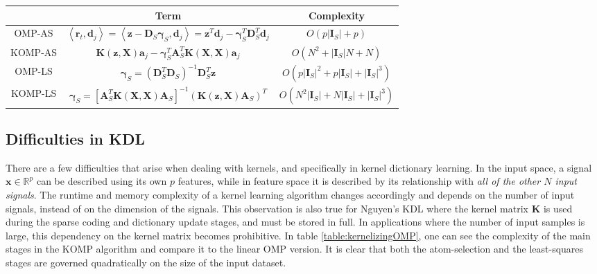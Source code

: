 \documentclass[journal]{IEEEtran}
\newcommand{\bD}{\mathbf{D}}
\newcommand{\bd}{\mathbf{d}}
\newcommand{\br}{\mathbf{r}}
\newcommand{\bx}{\mathbf{x}}
\newcommand{\bz}{\mathbf{z}}
\newcommand{\ba}{\mathbf{a}}
\newcommand{\bX}{\mathbf{X}}
\newcommand{\bK}{\mathbf{K}}
\newcommand{\bA}{\mathbf{A}}
\newcommand{\bI}{\mathbf{I}}
\newcommand{\bgamma}{\boldsymbol{\gamma}}
\begin{document}
\begin{table*}[!t]
\caption{Complexity of the atom selection (AS) and the least square (LS) stages in linear and kernel-OMP. $\bI_S$ is the current support vector and $|\bI_S|$ its length, $\bD_S$, $\bA_S$ and $\bgamma_S$ are sub-matrices of $\bD$, $\bA$, and $\bgamma$, respectively, corresponding to $\bI_S$. $\br_t$ is the residual.}
\label{table:kernelizingOMP}
\centering
\setlength{\extrarowheight}{5pt}
\begin{tabular}{|| c || c || c ||}
\multicolumn{1}{c}{} &\multicolumn{1}{c}{\bf Term}  &\multicolumn{1}{c}{\bf Complexity} \\
 \hline
 OMP-AS &
 $\left<\br_t,\bd_j\right>=\left<\bz-\bD_S\bgamma_S,\bd_j\right>=\bz^T\bd_j - \bgamma_S^T\bD_S^T\bd_j$ &
 $O\left(p|\bI_S| + p\right)$\\
 \hline

 KOMP-AS \cite{KDL} &
 $\bK(\bz,\bX)\ba_j - \bgamma_S^T\bA_S^T\bK(\bX,\bX)\ba_j$ &
 $O\left(N^2 + |\bI_S|N + N\right)$ \\
 \hline

 OMP-LS &
 $\bgamma_S = \left(\bD_S^T \bD_S\right)^{-1}\bD_S^T \bz$ &
 $O\left(p|\bI_S|^2 + p|\bI_S| + |\bI_S|^3\right)$\\
 \hline

 KOMP-LS \cite{KDL}&
 $\bgamma_S = \left[\bA_S^T \bK(\bX,\bX) \bA_S\right]^{-1}(\bK(\bz,\bX)\bA_S)^T$ &
 $O\left(N^2|\bI_S| + N|\bI_S| + |\bI_S|^3\right)$ \\
 \hline
\end{tabular}
\end{table*}


\subsection{Difficulties in KDL}\label{SS:KDLDifficult}

There are a few difficulties that arise when dealing with kernels, and specifically in kernel dictionary learning.
In the input space, a signal $\bx \in \mathbb{R}^p$ can be described using its own $p$ features, while in feature space it is described by its relationship with \textit{all of the other $N$ input signals}. The runtime and memory complexity of a kernel learning algorithm changes accordingly and depends on the number of input signals, instead of on the dimension of the signals. This observation is also true for Nguyen's KDL where the kernel matrix $\bK$ is used during the sparse coding and dictionary update stages, and must be stored in full. In applications where the number of input samples is large, this dependency on the kernel matrix becomes prohibitive. In table \ref{table:kernelizingOMP}, one can see the complexity of the main stages in the KOMP algorithm and compare it to the linear OMP version. It is clear that both the atom-selection and the least-squares stages are governed quadratically on the size of the input dataset.
\end{document}

